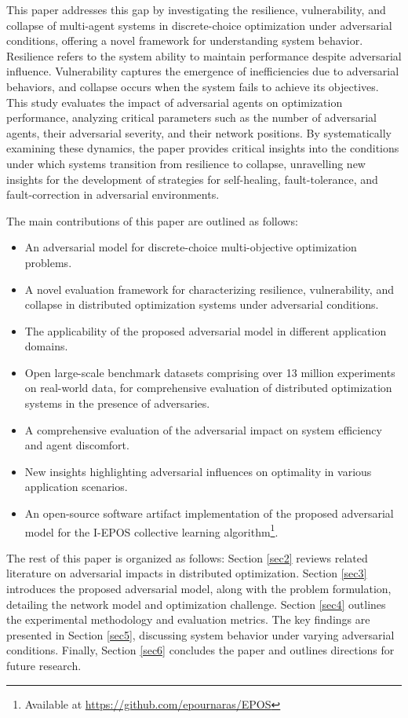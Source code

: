 \documentclass[journal]{IEEEtran}
\begin{document}
This paper addresses this gap by investigating the resilience, vulnerability, and collapse of multi-agent systems in discrete-choice optimization under adversarial conditions, offering a novel framework for understanding system behavior. Resilience refers to the system ability to maintain performance despite adversarial influence. Vulnerability captures the emergence of inefficiencies due to adversarial behaviors, and collapse occurs when the system fails to achieve its objectives. This study evaluates the impact of adversarial agents on optimization performance, analyzing critical parameters such as the number of adversarial agents, their adversarial severity, and their network positions. By systematically examining these dynamics, the paper provides critical insights into the conditions under which systems transition from resilience to collapse, unravelling new insights for the development of strategies \cite{9466159} for self-healing, fault-tolerance, and fault-correction in adversarial environments.

The main contributions of this paper are outlined as follows:
\begin{itemize}
    \item An adversarial model for discrete-choice multi-objective optimization problems. 
    \item A novel evaluation framework for characterizing resilience, vulnerability, and collapse in distributed optimization systems under adversarial conditions.
    \item The applicability of the proposed adversarial model in different application domains.
    \item  Open large-scale benchmark datasets comprising over 13 million experiments on real-world data, for comprehensive evaluation of distributed optimization systems in the presence of adversaries.
    \item A comprehensive evaluation of the adversarial impact on system efficiency and agent discomfort. 
    \item New insights highlighting adversarial influences on optimality in various application scenarios.
    \item An open-source software artifact implementation of the proposed adversarial model for the I-EPOS collective learning algorithm\footnote{Available at \url{https://github.com/epournaras/EPOS}}.
\end{itemize}

The rest of this paper is organized as follows: Section \ref{sec2} reviews related literature on adversarial impacts in distributed optimization. Section \ref{sec3} introduces the proposed adversarial model, along with the problem formulation, detailing the network model and optimization challenge. Section \ref{sec4} outlines the experimental methodology and evaluation metrics. The key findings are presented in Section \ref{sec5}, discussing system behavior under varying adversarial conditions. Finally, Section \ref{sec6} concludes the paper and outlines directions for future research.
\end{document}
